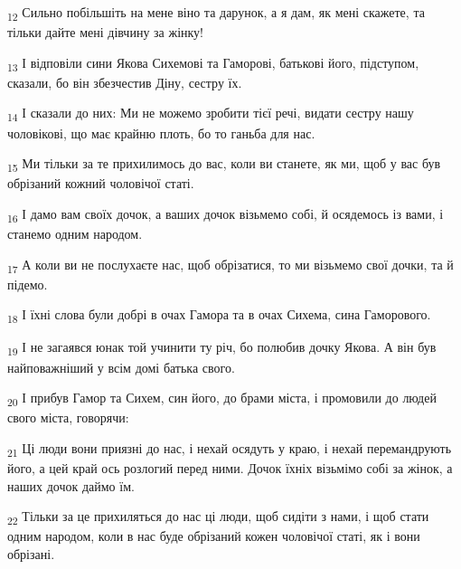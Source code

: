 \begin{tcolorbox}
\textsubscript{12} Сильно побільшіть на мене віно та дарунок, а я дам, як мені скажете, та тільки дайте мені дівчину за жінку!
\end{tcolorbox}
\begin{tcolorbox}
\textsubscript{13} І відповіли сини Якова Сихемові та Гаморові, батькові його, підступом, сказали, бо він збезчестив Діну, сестру їх.
\end{tcolorbox}
\begin{tcolorbox}
\textsubscript{14} І сказали до них: Ми не можемо зробити тієї речі, видати сестру нашу чоловікові, що має крайню плоть, бо то ганьба для нас.
\end{tcolorbox}
\begin{tcolorbox}
\textsubscript{15} Ми тільки за те прихилимось до вас, коли ви станете, як ми, щоб у вас був обрізаний кожний чоловічої статі.
\end{tcolorbox}
\begin{tcolorbox}
\textsubscript{16} І дамо вам своїх дочок, а ваших дочок візьмемо собі, й осядемось із вами, і станемо одним народом.
\end{tcolorbox}
\begin{tcolorbox}
\textsubscript{17} А коли ви не послухаєте нас, щоб обрізатися, то ми візьмемо свої дочки, та й підемо.
\end{tcolorbox}
\begin{tcolorbox}
\textsubscript{18} І їхні слова були добрі в очах Гамора та в очах Сихема, сина Гаморового.
\end{tcolorbox}
\begin{tcolorbox}
\textsubscript{19} І не загаявся юнак той учинити ту річ, бо полюбив дочку Якова. А він був найповажніший у всім домі батька свого.
\end{tcolorbox}
\begin{tcolorbox}
\textsubscript{20} І прибув Гамор та Сихем, син його, до брами міста, і промовили до людей свого міста, говорячи:
\end{tcolorbox}
\begin{tcolorbox}
\textsubscript{21} Ці люди вони приязні до нас, і нехай осядуть у краю, і нехай перемандрують його, а цей край ось розлогий перед ними. Дочок їхніх візьмімо собі за жінок, а наших дочок даймо їм.
\end{tcolorbox}
\begin{tcolorbox}
\textsubscript{22} Тільки за це прихиляться до нас ці люди, щоб сидіти з нами, і щоб стати одним народом, коли в нас буде обрізаний кожен чоловічої статі, як і вони обрізані.
\end{tcolorbox}
